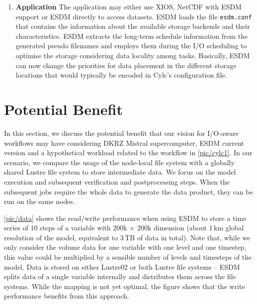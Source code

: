 \documentclass{superfri}
\begin{document}
\begin{enumerate}
  \item \textbf{Application}
  The application may either use XIOS, NetCDF with ESDM support or ESDM directly to access datasets.
  ESDM loads the file \texttt{esdm.conf} that contains the information about the available storage backends and their characteristics.
  ESDM extracts the long-term schedule information from the generated pseudo filenames and employs them during the I/O scheduling to optimise the storage considering data locality among tasks.
  Basically, ESDM can now change the priorities for data placement in the different storage locations that would typically be encoded in Cylc's configuration file.
\end{enumerate}

\section{Potential Benefit}
\label{sec:evaluation}

In this section, we discuss the potential benefit that our vision for I/O-aware workflows may have considering DKRZ Mistral supercomputer, ESDM current version and a hypothetical workload related to the workflow in \cref{pic/cylc1}.
In our scenario, we compare the usage of the node-local file system with a globally shared Lustre file system to store intermediate data.
We focus on the model execution and subsequent verification and postprocessing steps.
When the subsequent jobs require the whole data to generate the data product, they can be run on the same nodes.


\cref{pic/data} shows the read/write performance when using ESDM to store a time series of 10 steps of a variable with 200k $\times$ 200k dimension (about 1\,km global resolution of the model, equivalent to 3\,TB of data in total).
Note that, while we only consider the volume data for one variable with one level and one timestep, this value could be multiplied by a sensible number of levels and timesteps of the model.
Data is stored on either Lustre02 or both Lustre file systems -- ESDM splits data of a single variable internally and distributes them across the file systems.
While the mapping is not yet optimal, the figure shows that the write performance benefits from this approach.
\end{document}
